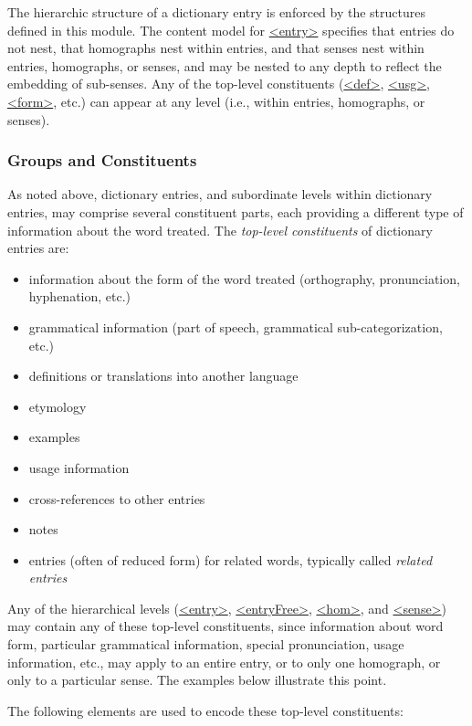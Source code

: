 The hierarchic structure of a dictionary entry is enforced by the structures defined in this module. The content model for \hyperref[TEI.entry]{<entry>} specifies that entries do not nest, that homographs nest within entries, and that senses nest within entries, homographs, or senses, and may be nested to any depth to reflect the embedding of sub-senses. Any of the top-level constituents (\hyperref[TEI.def]{<def>}, \hyperref[TEI.usg]{<usg>}, \hyperref[TEI.form]{<form>}, etc.) can appear at any level (i.e., within entries, homographs, or senses).
\subsubsection[{Groups and Constituents}]{Groups and Constituents}\label{DIENGP}\par
As noted above, dictionary entries, and subordinate levels within dictionary entries, may comprise several constituent parts, each providing a different type of information about the word treated. The \textit{top-level constituents} of dictionary entries are:\begin{itemize}
\item information about the form of the word treated (orthography, pronunciation, hyphenation, etc.)
\item grammatical information (part of speech, grammatical sub-categorization, etc.)
\item definitions or translations into another language
\item etymology
\item examples
\item usage information
\item cross-references to other entries
\item notes
\item entries (often of reduced form) for related words, typically called \textit{related entries}
\end{itemize}  Any of the hierarchical levels (\hyperref[TEI.entry]{<entry>}, \hyperref[TEI.entryFree]{<entryFree>}, \hyperref[TEI.hom]{<hom>}, and \hyperref[TEI.sense]{<sense>}) may contain any of these top-level constituents, since information about word form, particular grammatical information, special pronunciation, usage information, etc., may apply to an entire entry, or to only one homograph, or only to a particular sense. The examples below illustrate this point.\par
The following elements are used to encode these top-level constituents:
